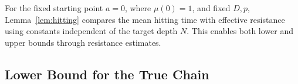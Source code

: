 \documentclass[conference]{IEEEtran}
\newcommand{\E}{\mathbb{E}}
\begin{document}

For the fixed starting point $a=0$, where $\mu(0)=1$, and fixed
$D,p$, Lemma~\ref{lem:hitting} compares the mean hitting time with
effective resistance using constants independent of the target depth
$N$. This enables both lower and upper bounds through resistance estimates.

\subsection{Lower Bound for the True Chain}
\label{sec:lower-bound}
\end{document}
